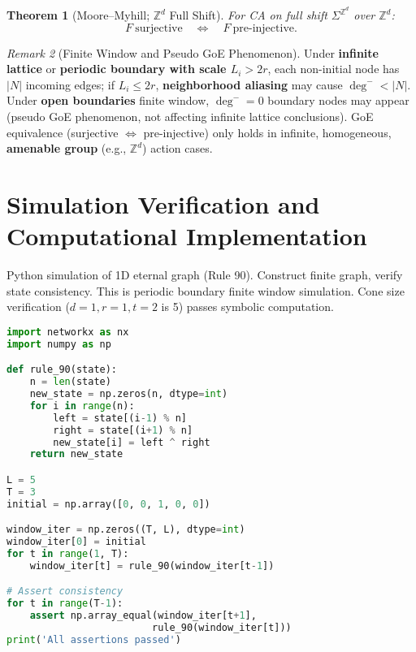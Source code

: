 \documentclass[11pt]{article}
\newtheorem{theorem}{Theorem}[section]
\theoremstyle{definition}
\theoremstyle{remark}
\newtheorem{remark}[theorem]{Remark}
\begin{document}
\begin{theorem}[Moore--Myhill; \( \mathbb Z^d \) Full Shift]\label{thm:moore}
For CA on full shift \( \Sigma^{\mathbb Z^d} \) over \( \mathbb Z^d \):
\[
F\ \text{surjective}\quad \Longleftrightarrow \quad F\ \text{pre-injective}.
\]
\end{theorem}

\begin{remark}[Finite Window and Pseudo GoE Phenomenon]\label{rem:goe}
Under \textbf{infinite lattice} or \textbf{periodic boundary with scale \( L_i>2r \)}, each non-initial node has \( |N| \) incoming edges; if \( L_i\le 2r \), \textbf{neighborhood aliasing} may cause \( \deg^-<|N| \). Under \textbf{open boundaries} finite window, \( \deg^-=0 \) boundary nodes may appear (pseudo GoE phenomenon, not affecting infinite lattice conclusions). GoE equivalence (surjective \( \Leftrightarrow \) pre-injective) only holds in infinite, homogeneous, \textbf{amenable group} (e.g., \( \mathbb Z^d \)) action cases.
\end{remark}

\section{Simulation Verification and Computational Implementation}\label{sec:simulation}

Python simulation of 1D eternal graph (Rule 90). Construct finite graph, verify state consistency. This is periodic boundary finite window simulation. Cone size verification (\( d=1,r=1,t=2 \) is 5) passes symbolic computation.

\begin{lstlisting}[language=Python,basicstyle=\small\ttfamily]
import networkx as nx
import numpy as np

def rule_90(state):
    n = len(state)
    new_state = np.zeros(n, dtype=int)
    for i in range(n):
        left = state[(i-1) % n]
        right = state[(i+1) % n]
        new_state[i] = left ^ right
    return new_state

L = 5
T = 3
initial = np.array([0, 0, 1, 0, 0])

window_iter = np.zeros((T, L), dtype=int)
window_iter[0] = initial
for t in range(1, T):
    window_iter[t] = rule_90(window_iter[t-1])

# Assert consistency
for t in range(T-1):
    assert np.array_equal(window_iter[t+1], 
                         rule_90(window_iter[t]))
print('All assertions passed')
\end{lstlisting}
\end{document}
